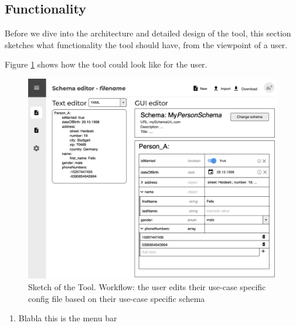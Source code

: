 

\subsection{Functionality}\label{subsec:functionality} %
Before we dive into the architecture and detailed design of the tool, this section sketches what functionality the tool should have, from the viewpoint of a user.

Figure \ref{mockup_gui_config} shows how the tool could look like for the user.


\begin{figure}[!t]
    \includegraphics[width=\textwidth]{figures/mockup_gui_config}
    \caption{Sketch of the Tool. Workflow: the user edits their use-case specific config file based on their use-case specific schema}
    \label{mockup_gui_config}
\end{figure}

\begin{enumerate}
    \item Blabla this is the menu bar
\end{enumerate}


